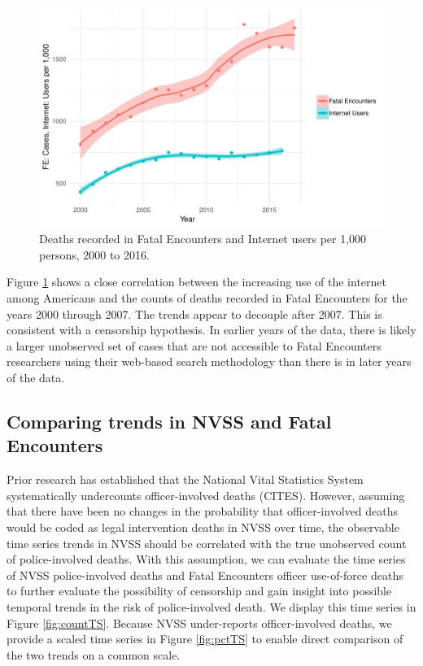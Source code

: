 \documentclass{article}
\begin{document}
\begin{figure}
	\centering
	\includegraphics[width=\linewidth]{vis/internet_use_ts.pdf}
	\caption{Deaths recorded in Fatal Encounters and Internet users per 1,000 persons, 2000 to 2016.}
	\label{fig:internet}
\end{figure}

Figure \ref{fig:internet} shows a close correlation between the increasing use of the internet among Americans and the counts of deaths recorded in Fatal Encounters for the years 2000 through 2007. The trends appear to decouple after 2007. This is consistent with a censorship hypothesis. In earlier years of the data, there is likely a larger unobserved set of cases that are not accessible to Fatal Encounters researchers using their web-based search methodology than there is in later years of the data. 

\subsection{Comparing trends in NVSS and Fatal Encounters}

Prior research has established that the National Vital Statistics System systematically undercounts officer-involved deaths (CITES). However, assuming that there have been no changes in the probability that officer-involved deaths would be coded as legal intervention deaths in NVSS over time, the observable time series trends in NVSS should be correlated with the true unobserved count of police-involved deaths. With this assumption, we can evaluate the time series of NVSS police-involved deaths and Fatal Encounters officer use-of-force deaths to further evaluate the possibility of censorship and gain insight into possible temporal trends in the risk of police-involved death. We display this time series in Figure \ref{fig:countTS}. Because NVSS under-reports officer-involved deaths, we provide a scaled time series in Figure \ref{fig:pctTS} to enable direct comparison of the two trends on a common scale. 
\end{document}
